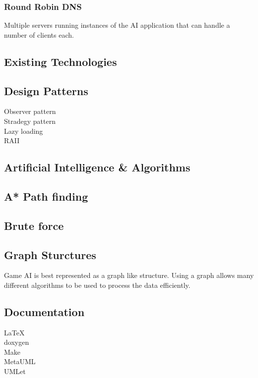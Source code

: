 \documentclass[12pt,a4paper,titlepage]{article}
\begin{document}
\subsubsection{Round Robin DNS}

Multiple servers running instances of the AI application that can handle a number of clients each. 

\subsection{Existing Technologies}

\subsection{Design Patterns}
Observer pattern\\
Stradegy pattern\\
Lazy loading\\
RAII\\

\subsection{Artificial Intelligence \& Algorithms}

\subsection{A* Path finding}

\subsection{Brute force}

\subsection{Graph Sturctures}

Game AI is best represented as a graph like structure. Using a graph allows many different algorithms to be used to process the data efficiently.

\subsection{Documentation}
LaTeX\\
doxygen\\
Make\\
MetaUML\\
UMLet\\
\end{document}
